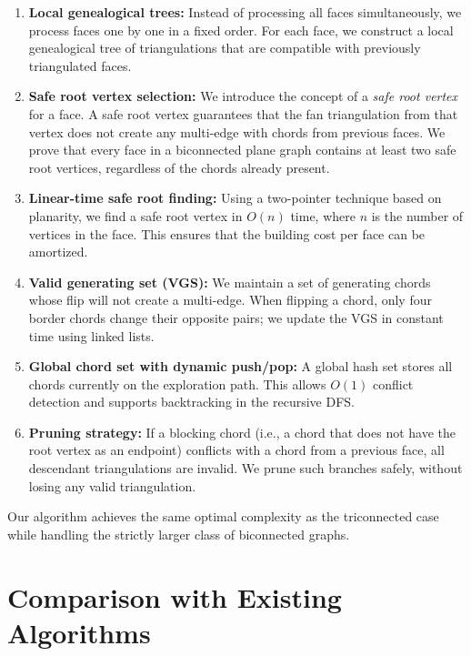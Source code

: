 \begin{enumerate}
    \item \textbf{Local genealogical trees:} Instead of processing all faces simultaneously, we process faces one by one in a fixed order. 
    For each face, we construct a local genealogical tree of triangulations that are compatible with previously triangulated faces.
    
    \item \textbf{Safe root vertex selection:} We introduce the concept of a \emph{safe root vertex} for a face. 
    A safe root vertex guarantees that the fan triangulation from that vertex does not create any multi-edge with chords from previous faces. 
    We prove that every face in a biconnected plane graph contains at least two safe root vertices, regardless of the chords already present.
    
    \item \textbf{Linear-time safe root finding:} Using a two-pointer technique based on planarity, we find a safe root vertex in \(O(n)\) time, where \(n\) is the number of vertices in the face. 
    This ensures that the building cost per face can be amortized.
    
    \item \textbf{Valid generating set (VGS):} We maintain a set of generating chords whose flip will not create a multi-edge. 
    When flipping a chord, only four border chords change their opposite pairs; we update the VGS in constant time using linked lists.
    
    \item \textbf{Global chord set with dynamic push/pop:} A global hash set stores all chords currently on the exploration path. 
    This allows \(O(1)\) conflict detection and supports backtracking in the recursive DFS.
    
    \item \textbf{Pruning strategy:} If a blocking chord (i.e., a chord that does not have the root vertex as an endpoint) conflicts with a chord from a previous face, all descendant triangulations are invalid. 
    We prune such branches safely, without losing any valid triangulation.
\end{enumerate}

Our algorithm achieves the same optimal complexity as the triconnected case while handling the strictly larger class of biconnected graphs.

\section{Comparison with Existing Algorithms}
\label{sec:comparison}

